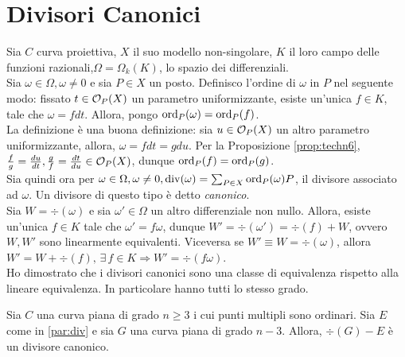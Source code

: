     \section{Divisori Canonici}
        Sia $C$ curva proiettiva, $X$ il suo modello non-singolare, $K$ il loro campo delle funzioni razionali,$\Omega = \Omega_k(K)$, lo spazio dei differenziali. \\
        Sia $\omega \in \Omega, \omega \neq 0$ e sia $P \in X$ un posto. Definisco l'ordine di $\omega$ in $P$ nel seguente modo: fissato $t \in \mathcal{O}_P(X)$ un parametro 
        uniformizzante, esiste un'unica $f \in K$, tale che $\omega = fdt$. Allora, pongo $\operatorname{ord}_P(\omega) = \operatorname{ord}_P(f)$. \\
        La definizione è una buona definizione: sia $u \in \mathcal{O}_P(X)$ un altro parametro uniformizzante, allora, $\omega = fdt = gdu$. Per la Proposizione \ref{prop:techn6}, 
        $\frac{f}{g} = \frac{du}{dt}, \frac{g}{f} = \frac{dt}{du} \in \mathcal{O}_P(X)$, dunque $\operatorname{ord}_P(f) = \operatorname{ord}_P(g)$.\\
        Sia quindi ora per $\omega \in \Omega, \omega \neq 0, \operatorname{div}(\omega) = \sum_{P \in X} \operatorname{ord}_P(\omega)P$, il divisore associato ad $\omega$. Un divisore di questo tipo è detto 
        \emph{canonico}. \\
        Sia $W = \div(\omega)$ e sia $\omega' \in \Omega$ un altro differenziale non nullo. Allora, esiste un'unica $f \in K$ tale che $\omega' = f \omega$, dunque $W' = \div(\omega') 
        = \div(f) + W$, ovvero $W,W'$ sono linearmente equivalenti. Viceversa se $W' \equiv W = \div(\omega)$, allora $W' = W + \div(f), \, \exists \, f \in K \Longrightarrow W' = \div(f \omega)$. \\
        Ho dimostrato che i divisori canonici sono una classe di equivalenza rispetto alla lineare equivalenza. In particolare hanno tutti lo stesso grado.
        \begin{proposizione}
            Sia $C$ una curva piana di grado $n \geq 3$ i cui punti multipli sono ordinari. Sia $E$ come in \ref{par:div} e sia $G$ una curva piana di grado $n-3$. Allora, $\div(G) - E$ è un divisore canonico.
        \end{proposizione}
